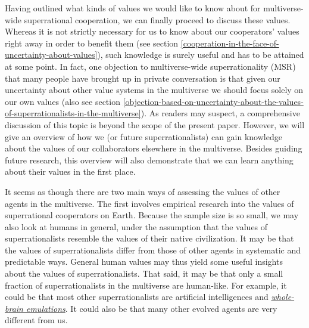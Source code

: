 Having outlined what kinds of values we would like to know about for
multiverse-wide superrational cooperation, we can finally proceed to
discuss these values. Whereas it is not strictly necessary for us to
know about our cooperators' values right away in order to benefit them
(see section
\ref{cooperation-in-the-face-of-uncertainty-about-values}), such
knowledge is surely useful and has to be attained at some point. In
fact, one objection to multiverse-wide superrationality (MSR) that many
people have brought up in private conversation is that given our
uncertainty about other value systems in the multiverse we should focus
solely on our own values (also see section
\ref{objection-based-on-uncertainty-about-the-values-of-superrationalists-in-the-multiverse}). As readers may suspect, a comprehensive discussion of
this topic is beyond the scope of the present paper. However, we will
give an overview of how we (or future superrationalists) can gain
knowledge about the values of our collaborators elsewhere in the
multiverse. Besides guiding future research, this overview will also
demonstrate that we can learn anything about their values in the first
place.

It seems as though there are two main ways of assessing the values of
other agents in the multiverse. The first involves empirical research
into the values of superrational cooperators on Earth. Because the
sample size is so small, we may also look at humans in general, under
the assumption that the values of superrationalists resemble the values
of their native civilization. It may be that the values of
superrationalists differ from those of other agents in systematic and
predictable ways. General human values may thus yield some useful
insights about the values of superrationalists. That said, it may be
that only a small fraction of superrationalists in the multiverse are
human-like. For example, it could be that most other superrationalists
are artificial intelligences and
\href{https://en.wikipedia.org/wiki/Mind_uploading}{\emph{whole-brain
emulations}}. It could also be that many other evolved agents are very
different from us.

